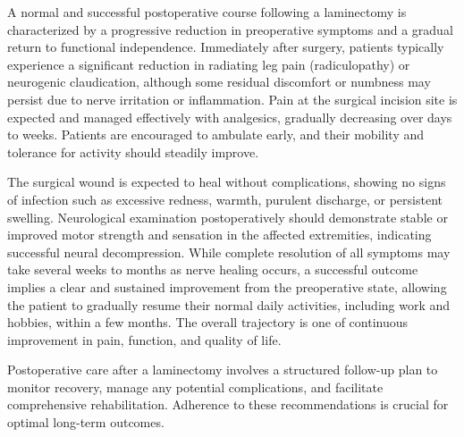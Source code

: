 A normal and successful postoperative course following a laminectomy is characterized by a progressive reduction in preoperative symptoms and a gradual return to functional independence. Immediately after surgery, patients typically experience a significant reduction in radiating leg pain (radiculopathy) or neurogenic claudication, although some residual discomfort or numbness may persist due to nerve irritation or inflammation. Pain at the surgical incision site is expected and managed effectively with analgesics, gradually decreasing over days to weeks. Patients are encouraged to ambulate early, and their mobility and tolerance for activity should steadily improve.

The surgical wound is expected to heal without complications, showing no signs of infection such as excessive redness, warmth, purulent discharge, or persistent swelling. Neurological examination postoperatively should demonstrate stable or improved motor strength and sensation in the affected extremities, indicating successful neural decompression. While complete resolution of all symptoms may take several weeks to months as nerve healing occurs, a successful outcome implies a clear and sustained improvement from the preoperative state, allowing the patient to gradually resume their normal daily activities, including work and hobbies, within a few months. The overall trajectory is one of continuous improvement in pain, function, and quality of life.

Postoperative care after a laminectomy involves a structured follow-up plan to monitor recovery, manage any potential complications, and facilitate comprehensive rehabilitation. Adherence to these recommendations is crucial for optimal long-term outcomes.

